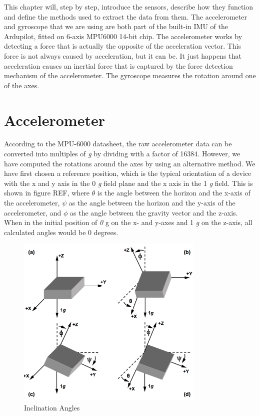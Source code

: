 This chapter will, step by step, introduce the sensors, describe how they function and define the methods used to extract the data from them. The accelerometer and gyroscope that we are using are both part of the built-in IMU of the Ardupilot, fitted on 6-axis MPU6000 14-bit chip. The accelerometer works by detecting a force that is actually the opposite of the acceleration vector. This force is not always caused by acceleration, but it can be. It just happens that acceleration causes an inertial force that is captured by the force detection mechanism of the accelerometer. The gyroscope measures the rotation around one of the axes.

\section{Accelerometer}
According to the MPU-6000 datasheet\cite{MPU6000}, the raw accelerometer data can be converted into multiples of \textit{g} by dividing with a factor of 16384. However, we have computed the rotations around the axes by using an alternative method. We have first chosen a reference position, which is the typical orientation of a device with the x and y axis in the 0 \textit{g} field plane and the x axis in the 1 \textit{g} field. This is shown in figure REF, where $\theta$ is the angle between the horizon and the x-axis of the accelerometer, $\psi$ as the angle between the horizon and the y-axis of the accelerometer, and
$\phi$ as the angle between the gravity vector and the z-axis. When in the initial position of \textit{0} g on the x- and y-axes and 1 \textit{g} on the z-axis, all calculated angles would be 0 degrees\cite{AccelCite1}.

\begin{figure}[H]
  \centering
    \includegraphics[width=0.8\textwidth]{images/accangle.png}
	\caption{Inclination Angles \cite{AccelCite1}}
	\label{acc}
\end{figure} 

